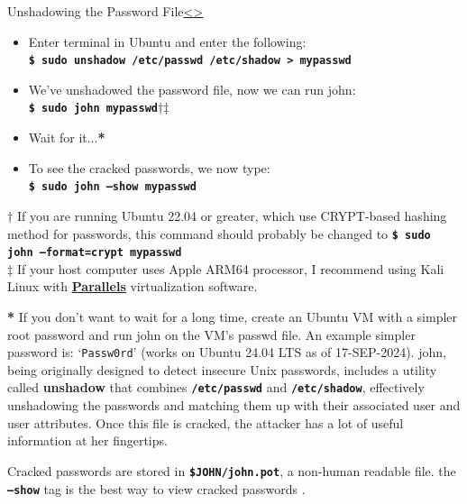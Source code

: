 \documentclass[12pt]{extarticle}
\newcommand{\code}[1]{\texttt{\bfseries#1}}
\newenvironment{instructionblock}{\Large\bgroup}{\egroup}
\begin{document}
	\pagebreak
	\begin{slide}{Unshadowing the Password File}{\hyperref[slide 8]{\textless}\hyperref[slide 10]{\textgreater}}
		\begin{instructionblock}
			\begin{itemize}
				\item Enter terminal in Ubuntu and enter the following:\\
				\code{\$ sudo unshadow /etc/passwd /etc/shadow > mypasswd} 	
				\item We've unshadowed the password file, now we can run john:\\
				\code{\$ sudo john mypasswd{\textbf{$\dagger$}}{\textbf{$\ddagger$}}}
				\item{Wait for it...\textbf{*}}
				\item{To see the cracked passwords, we now type:}\\
				\code{\$ sudo john --show mypasswd}
			\end{itemize}
		\end{instructionblock}
	\end{slide}
	\textbf{$\dagger$} If you are running Ubuntu 22.04 or greater, which use CRYPT-based hashing method for passwords, this command should probably be changed to {\code{\$ sudo john --format=crypt mypasswd}}\\
	\textbf{$\ddagger$} If your host computer uses Apple ARM64 processor, I recommend using Kali Linux with 
	{\hyperref{https://www.kali.org/docs/virtualization/install-parallels-guest-vm/}{}{}{\underline{\textbf{Parallels}}}} virtualization software.
	
	\textbf{*} If you don't want to wait for a long time, create an Ubuntu VM with a simpler root password and run john on the VM's passwd file. An example simpler password is: `\texttt{Passw0rd}' (works on Ubuntu 24.04 LTS as of 17-SEP-2024).
	\vfill
	john, being originally designed to detect insecure Unix passwords, includes a utility called \textbf{unshadow} that combines \code{/etc/passwd} and \code{/etc/shadow}, effectively unshadowing the passwords and matching them up with their associated user and user attributes. Once this file is cracked, the attacker has a lot of useful information at her fingertips. \cite{john}
	
	Cracked passwords are stored in \code{\$JOHN/john.pot}, a non-human readable file. the \code{--show} tag is the best way to view cracked passwords \cite{john}.
	
\end{document}
